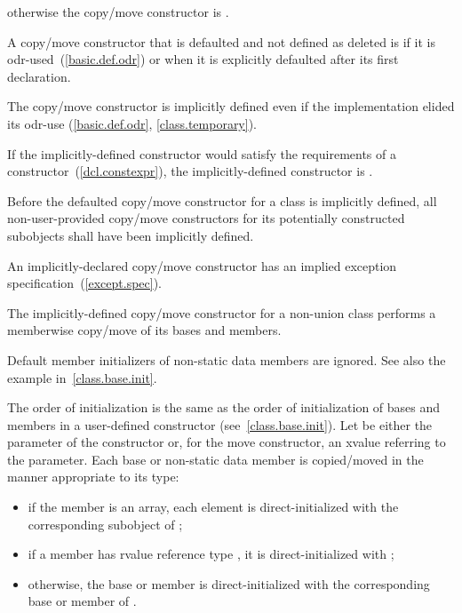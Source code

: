 otherwise the copy/move constructor is
.

\pnum
{}%
%
A copy/move constructor
that is defaulted and not defined as deleted
is
if it is odr-used~(\ref{basic.def.odr})
or when it is explicitly defaulted after its first declaration.
\begin{note}
The copy/move constructor is implicitly defined even if the implementation elided
its odr-use (\ref{basic.def.odr}, \ref{class.temporary}).
\end{note}
If the implicitly-defined constructor would satisfy the requirements of a
 constructor~(\ref{dcl.constexpr}), the implicitly-defined
constructor is .

\pnum
Before the defaulted copy/move constructor for a class is
implicitly defined,
all non-user-provided copy/move constructors for its
potentially constructed subobjects
shall have been implicitly defined.
\begin{note}
An implicitly-declared copy/move constructor has an
implied exception specification~(\ref{except.spec}).
\end{note}

\pnum
The implicitly-defined copy/move constructor for a non-union class
performs a memberwise copy/move of its bases and members.
\begin{note} Default member initializers of non-static data members are ignored. See also the example in~\ref{class.base.init}. \end{note}
The order of initialization is the same as the order of initialization of bases
and members in a user-defined constructor (see~\ref{class.base.init}).
Let  be either the parameter of the constructor or, for the move constructor, an
xvalue referring to the parameter.
Each base or non-static data member
is copied/moved in the manner appropriate to its type:

\begin{itemize}
\item
if the member is an array, each element is
direct-initialized with the corresponding subobject of ;

\item
if a member  has rvalue reference type , it is direct-initialized with
;

\item
otherwise, the base or member is direct-initialized with the corresponding base or member of .
\end{itemize}

